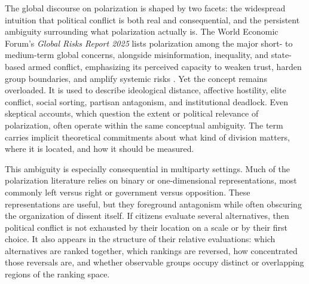 \documentclass[12pt]{article}
\begin{document}






The global discourse on polarization is shaped by two  facets: the widespread intuition that political conflict is both real and consequential, and the persistent ambiguity surrounding what polarization actually is. The World Economic Forum's \emph{Global Risks Report 2025} lists polarization among the major short- to medium-term global concerns, alongside misinformation, inequality, and state-based armed conflict, emphasizing its perceived capacity to weaken trust, harden group boundaries, and amplify systemic risks \parencite{elsner2025global}. Yet the concept remains overloaded. It is used to describe ideological distance, affective hostility, elite conflict, social sorting, partisan antagonism, and institutional deadlock. Even skeptical accounts, which question the extent or political relevance of polarization, often operate within the same conceptual ambiguity. The term carries implicit theoretical commitments about what kind of division matters, where it is located, and how it should be measured.

This ambiguity is especially consequential in multiparty settings. Much of the polarization literature relies on binary or one-dimensional representations, most commonly left versus right or government versus opposition. These representations are useful, but they foreground antagonism while often obscuring the organization of dissent itself. If citizens evaluate several alternatives, then political conflict is not exhausted by their location on a scale or by their first choice. It also appears in the structure of their relative evaluations: which alternatives are ranked together, which rankings are reversed, how concentrated those reversals are, and whether observable groups occupy distinct or overlapping regions of the ranking space.
\end{document}
